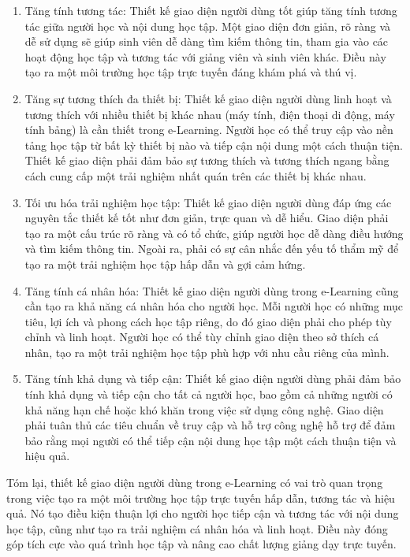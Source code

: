 \documentclass[../Thesis.tex]{subfiles}
\begin{document}
\begin{enumerate}
	\item Tăng tính tương tác: Thiết kế giao diện người dùng tốt giúp tăng tính tương tác giữa người học và nội dung học tập. Một giao diện đơn giản, rõ ràng và dễ sử dụng sẽ giúp sinh viên dễ dàng tìm kiếm thông tin, tham gia vào các hoạt động học tập và tương tác với giảng viên và sinh viên khác. Điều này tạo ra một môi trường học tập trực tuyến đáng khám phá và thú vị.

	\item Tăng sự tương thích đa thiết bị: Thiết kế giao diện người dùng linh hoạt và tương thích với nhiều thiết bị khác nhau (máy tính, điện thoại di động, máy tính bảng) là cần thiết trong e-Learning. Người học có thể truy cập vào nền tảng học tập từ bất kỳ thiết bị nào và tiếp cận nội dung một cách thuận tiện. Thiết kế giao diện phải đảm bảo sự tương thích và tương thích ngang bằng cách cung cấp một trải nghiệm nhất quán trên các thiết bị khác nhau.

	\item Tối ưu hóa trải nghiệm học tập: Thiết kế giao diện người dùng đáp ứng các nguyên tắc thiết kế tốt như đơn giản, trực quan và dễ hiểu. Giao diện phải tạo ra một cấu trúc rõ ràng và có tổ chức, giúp người học dễ dàng điều hướng và tìm kiếm thông tin. Ngoài ra, phải có sự cân nhắc đến yếu tố thẩm mỹ để tạo ra một trải nghiệm học tập hấp dẫn và gợi cảm hứng.

	\item Tăng tính cá nhân hóa: Thiết kế giao diện người dùng trong e-Learning cũng cần tạo ra khả năng cá nhân hóa cho người học. Mỗi người học có những mục tiêu, lợi ích và phong cách học tập riêng, do đó giao diện phải cho phép tùy chỉnh và linh hoạt. Người học có thể tùy chỉnh giao diện theo sở thích cá nhân, tạo ra một trải nghiệm học tập phù hợp với nhu cầu riêng của mình.

	\item Tăng tính khả dụng và tiếp cận: Thiết kế giao diện người dùng phải đảm bảo tính khả dụng và tiếp cận cho tất cả người học, bao gồm cả những người có khả năng hạn chế hoặc khó khăn trong việc sử dụng công nghệ. Giao diện phải tuân thủ các tiêu chuẩn về truy cập và hỗ trợ công nghệ hỗ trợ để đảm bảo rằng mọi người có thể tiếp cận nội dung học tập một cách thuận tiện và hiệu quả.
\end{enumerate}
Tóm lại, thiết kế giao diện người dùng trong e-Learning có vai trò quan trọng trong việc tạo ra một môi trường học tập trực tuyến hấp dẫn, tương tác và hiệu quả. Nó tạo điều kiện thuận lợi cho người học tiếp cận và tương tác với nội dung học tập, cũng như tạo ra trải nghiệm cá nhân hóa và linh hoạt. Điều này đóng góp tích cực vào quá trình học tập và nâng cao chất lượng giảng dạy trực tuyến.
\end{document}
